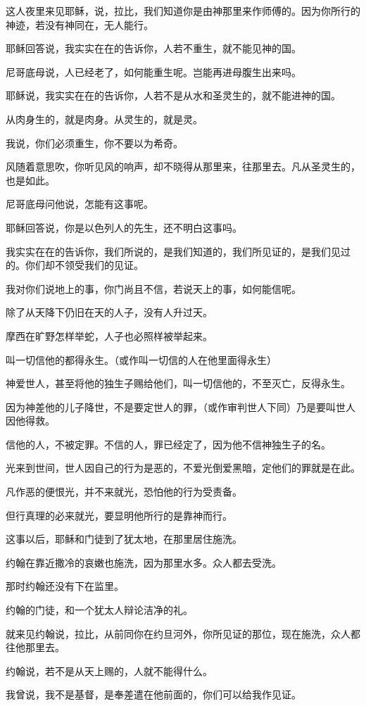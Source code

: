 \documentclass[12pt,oneside]{book}
\begin{document}
这人夜里来见耶稣，说，拉比，我们知道你是由神那里来作师傅的。因为你所行的神迹，若没有神同在，无人能行。

耶稣回答说，我实实在在的告诉你，人若不重生，就不能见神的国。

尼哥底母说，人已经老了，如何能重生呢。岂能再进母腹生出来吗。

耶稣说，我实实在在的告诉你，人若不是从水和圣灵生的，就不能进神的国。

从肉身生的，就是肉身。从灵生的，就是灵。

我说，你们必须重生，你不要以为希奇。

风随着意思吹，你听见风的响声，却不晓得从那里来，往那里去。凡从圣灵生的，也是如此。

尼哥底母问他说，怎能有这事呢。

耶稣回答说，你是以色列人的先生，还不明白这事吗。

我实实在在的告诉你，我们所说的，是我们知道的，我们所见证的，是我们见过的。你们却不领受我们的见证。

我对你们说地上的事，你门尚且不信，若说天上的事，如何能信呢。

除了从天降下仍旧在天的人子，没有人升过天。

摩西在旷野怎样举蛇，人子也必照样被举起来。

叫一切信他的都得永生。（或作叫一切信的人在他里面得永生）

神爱世人，甚至将他的独生子赐给他们，叫一切信他的，不至灭亡，反得永生。

因为神差他的儿子降世，不是要定世人的罪，（或作审判世人下同）乃是要叫世人因他得救。

信他的人，不被定罪。不信的人，罪已经定了，因为他不信神独生子的名。

光来到世间，世人因自己的行为是恶的，不爱光倒爱黑暗，定他们的罪就是在此。

凡作恶的便恨光，并不来就光，恐怕他的行为受责备。

但行真理的必来就光，要显明他所行的是靠神而行。

这事以后，耶稣和门徒到了犹太地，在那里居住施洗。

约翰在靠近撒冷的哀嫩也施洗，因为那里水多。众人都去受洗。

那时约翰还没有下在监里。

约翰的门徒，和一个犹太人辩论洁净的礼。

就来见约翰说，拉比，从前同你在约旦河外，你所见证的那位，现在施洗，众人都往他那里去。

约翰说，若不是从天上赐的，人就不能得什么。

我曾说，我不是基督，是奉差遣在他前面的，你们可以给我作见证。
\end{document}
